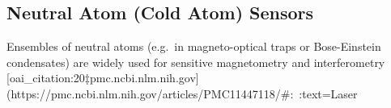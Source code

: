 \documentclass[12pt]{article}
\begin{document}
\subsection{Neutral Atom (Cold Atom) Sensors}
Ensembles of neutral atoms (e.g.\ in magneto-optical traps or Bose-Einstein condensates) are widely used for sensitive magnetometry and interferometry [oai_citation:20‡pmc.ncbi.nlm.nih.gov](https://pmc.ncbi.nlm.nih.gov/articles/PMC11447118/#:~:text=Laser%
\end{document}
